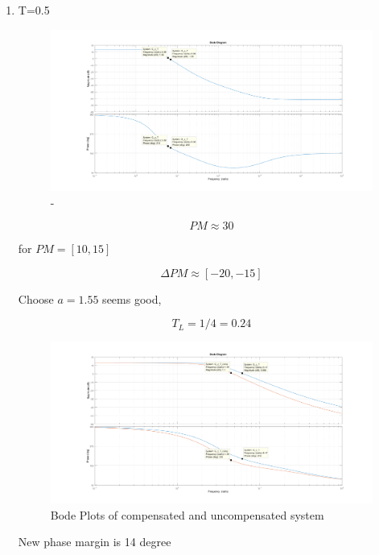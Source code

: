 \documentclass[a4paper,12pt]{article}
\begin{document}
\begin{enumerate}
	\item T=0.5
	
	\begin{figure}[H]
			\center
			\setlength{\unitlength}{\textwidth} 
		\includegraphics[width=1.0\unitlength]{images/uncomped}
  		\caption{\label{fig:10}-}
	\end{figure}
	
	$$ PM \approx 30$$
	
	
	for $PM=[10,15]$
	
	$$ \Delta PM \approx [-20,-15] $$
	
	Choose $ a=1.55 $ seems good,  
	
	$$ T_L=1/4=0.24 $$
	
	\begin{figure}[H]
			\center
			\setlength{\unitlength}{\textwidth} 
		\includegraphics[width=1.0\unitlength]{images/compedb1}
  		\caption{\label{fig:10}Bode Plots of compensated and uncompensated system}
	\end{figure}
	
	New phase margin is 14 degree
	

\end{enumerate}
\end{document}
